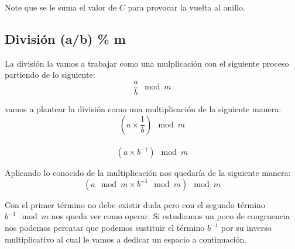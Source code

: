  Note que se le suma el valor de $C$ para provocar la vuelta al anillo.
 
\subsection{División (a/b) \% m}

La división la vamos a trabajar como una mulplicación con el siguiente proceso partiendo de lo siguiente:
\\
$$\frac{a}{b} \mod m$$

vamos a plantear la división como una multiplicación de la siguiente manera:
$$(a \times \frac{1}{b}) \mod m$$\\ 
$$(a \times b^{-1}) \mod m$$

Aplicando lo conocido de la multiplicación nos quedaría de la siguiente manera:
$$(a \mod m \times b^{-1} \mod m ) \mod m$$

Con el primer término no debe existir duda pero con el segundo término $b^{-1} \mod m$ nos queda ver como operar. Si estudiamos un poco de congruencia nos podemos percatar que podemos sustituir el término $b^{-1}$ por su inverso multiplicativo al cual le vamos a dedicar un espacio a continuación.


 


